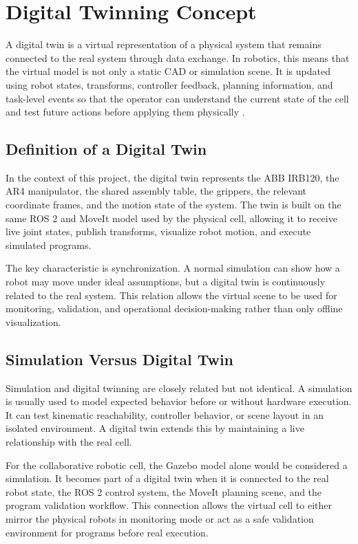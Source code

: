 \section{Digital Twinning Concept}

A digital twin is a virtual representation of a physical system that remains connected to the real system through data exchange. In robotics, this means that the virtual model is not only a static CAD or simulation scene. It is updated using robot states, transforms, controller feedback, planning information, and task-level events so that the operator can understand the current state of the cell and test future actions before applying them physically \cite{glaessgen2012digital,wang2020digital}.

\subsection{Definition of a Digital Twin}

In the context of this project, the digital twin represents the ABB IRB120, the AR4 manipulator, the shared assembly table, the grippers, the relevant coordinate frames, and the motion state of the system. The twin is built on the same ROS 2 and MoveIt model used by the physical cell, allowing it to receive live joint states, publish transforms, visualize robot motion, and execute simulated programs.

The key characteristic is synchronization. A normal simulation can show how a robot may move under ideal assumptions, but a digital twin is continuously related to the real system. This relation allows the virtual scene to be used for monitoring, validation, and operational decision-making rather than only offline visualization.

\subsection{Simulation Versus Digital Twin}

Simulation and digital twinning are closely related but not identical. A simulation is usually used to model expected behavior before or without hardware execution. It can test kinematic reachability, controller behavior, or scene layout in an isolated environment. A digital twin extends this by maintaining a live relationship with the real cell.

For the collaborative robotic cell, the Gazebo model alone would be considered a simulation. It becomes part of a digital twin when it is connected to the real robot state, the ROS 2 control system, the MoveIt planning scene, and the program validation workflow. This connection allows the virtual cell to either mirror the physical robots in monitoring mode or act as a safe validation environment for programs before real execution.

